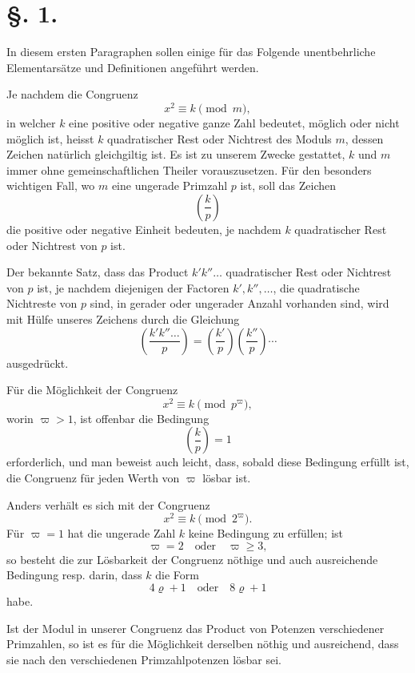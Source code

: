 \documentclass[11pt]{article}
\newcommand{\J}[2]{\left(\frac{#1}{#2}\right)}
\begin{document}
\section*{\S. 1.}

In diesem ersten Paragraphen sollen einige für das Folgende unentbehrliche Elementarsätze und Definitionen angeführt werden.

Je nachdem die Congruenz
\[
 x^2\equiv k \pmod m,
\]
in welcher $k$ eine positive oder negative ganze Zahl bedeutet, möglich oder nicht möglich ist, heisst $k$ quadratischer Rest oder Nichtrest des Moduls $m$, dessen Zeichen natürlich gleichgiltig ist. Es ist zu unserem Zwecke gestattet, $k$ und $m$ immer ohne gemeinschaftlichen Theiler vorauszusetzen. Für den besonders wichtigen Fall, wo $m$ eine ungerade Primzahl $p$ ist, soll das Zeichen
\[
 \J{k}{p}
\]
die positive oder negative Einheit bedeuten, je nachdem $k$ quadratischer Rest oder Nichtrest von $p$ ist.

Der bekannte Satz, dass das Product $k'k''\ldots$ quadratischer Rest oder Nichtrest von $p$ ist, je nachdem diejenigen der Factoren $k',k'',\ldots$, die quadratische Nichtreste von $p$ sind, in gerader oder ungerader Anzahl vorhanden sind, wird mit Hülfe unseres Zeichens durch die Gleichung
\[
 \J{k'k''\ldots}{p}=\J{k'}{p}\J{k''}{p}\cdots
\]
ausgedrückt.

Für die Möglichkeit der Congruenz
\[
 x^2\equiv k \pmod {p^{\varpi}},
\]
worin $\varpi>1$, ist offenbar die Bedingung
\[
 \J{k}{p}=1
\]
erforderlich, und man beweist auch leicht, dass, sobald diese Bedingung erfüllt ist, die Congruenz für jeden Werth von $\varpi$ lösbar ist.

Anders verhält es sich mit der Congruenz
\[
 x^2\equiv k \pmod {2^{\varpi}}.
\]
Für $\varpi=1$ hat die ungerade Zahl $k$ keine Bedingung zu erfüllen; ist
\[
 \varpi=2 \quad\text{oder}\quad \varpi\geq 3,
\]
so besteht die zur Lösbarkeit der Congruenz nöthige und auch ausreichende Bedingung resp. darin, dass $k$ die Form
\[
 4\varrho+1\quad\text{oder}\quad 8\varrho+1
\]
habe.

Ist der Modul in unserer Congruenz das Product von Potenzen verschiedener Primzahlen, so ist es für die Möglichkeit derselben nöthig und ausreichend, dass sie nach den verschiedenen Primzahlpotenzen lösbar sei.
\end{document}
